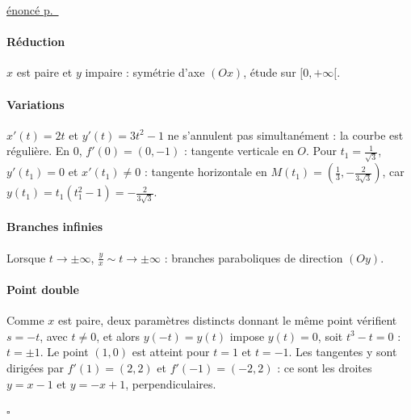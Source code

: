 \documentclass[a4paper,11pt]{article}
\numberwithin{equation}{section}
\numberwithin{figure}{section}
\numberwithin{table}{section}
\theoremstyle{enonce}
\theoremstyle{exemple}
\theoremstyle{remarque}
\newenvironment{corrige}[1]{%
  \par\needspace{6\baselineskip}\vspace{1em}\phantomsection\label{c:#1}%
  \noindent{\sffamily\bfseries\color{Bleu}Exercice~\ref{e:#1}}\quad
  {\scriptsize\sffamily\hyperref[e:#1]{\color{Gris}énoncé p.~\pageref{e:#1}}}\par\nobreak\vspace{0.2em}}%
  {\hfill\textcolor{BleuClair}{$\square$}\par}
\begin{document}
\begin{corrige}{b-noeud}
\paragraph{Réduction} $x$ est paire et $y$ impaire : symétrie d'axe $(Ox)$, étude sur $[0,+\infty[$.

\paragraph{Variations} $x'(t)=2t$ et $y'(t)=3t^2-1$ ne s'annulent pas simultanément : la courbe est régulière. En $0$,
$f'(0)=(0,-1)$ : tangente verticale en $O$. Pour $t_1=\frac1{\sqrt3}$, $y'(t_1)=0$ et $x'(t_1)\neq0$ : tangente
horizontale en $M(t_1)=\left(\frac13,-\frac2{3\sqrt3}\right)$, car $y(t_1)=t_1(t_1^2-1)=-\frac2{3\sqrt3}$.
\begin{center}
\end{center}

\paragraph{Branches infinies} Lorsque $t\to\pm\infty$, $\frac yx\sim t\to\pm\infty$ : branches paraboliques de direction
$(Oy)$.

\paragraph{Point double} Comme $x$ est paire, deux paramètres distincts donnant le même point vérifient $s=-t$, avec
$t\neq0$, et alors $y(-t)=y(t)$ impose $y(t)=0$, soit $t^3-t=0$ : $t=\pm1$. Le point $(1,0)$ est atteint pour $t=1$ et
$t=-1$. Les tangentes y sont dirigées par $f'(1)=(2,2)$ et $f'(-1)=(-2,2)$ : ce sont les droites $y=x-1$ et $y=-x+1$,
perpendiculaires.
\begin{center}
\end{center}
\end{corrige}
\end{document}
